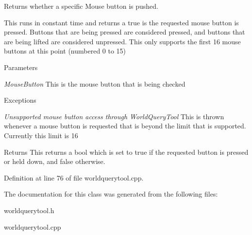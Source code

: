 Returns whether a specific Mouse button is pushed. 

This runs in constant time and returns a true is the requested mouse button is pressed. Buttons that are being pressed are considered pressed, and buttons that are being lifted are considered unpressed. This only supports the first 16 mouse buttons at this point (numbered 0 to 15) 
\begin{DoxyParams}{Parameters}
\item[{\em MouseButton}]This is the mouse button that is being checked \end{DoxyParams}

\begin{DoxyExceptions}{Exceptions}
\item[{\em Unsupported mouse button access through WorldQueryTool}]This is thrown whenever a mouse button is requested that is beyond the limit that is supported. Currently this limit is 16 \end{DoxyExceptions}
\begin{DoxyReturn}{Returns}
This returns a bool which is set to true if the requested button is pressed or held down, and false otherwise. 
\end{DoxyReturn}


Definition at line 76 of file worldquerytool.cpp.



The documentation for this class was generated from the following files:\begin{DoxyCompactItemize}
\item 
worldquerytool.h\item 
worldquerytool.cpp\end{DoxyCompactItemize}
